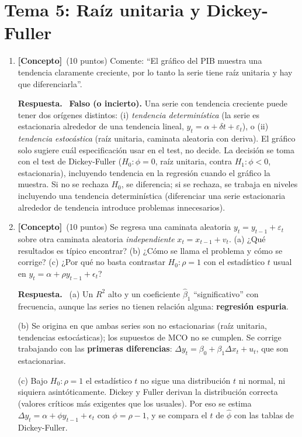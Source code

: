 \documentclass[12pt,letterpaper]{article}
\newenvironment{resp}{\begingroup\color{blue}\par\noindent\textbf{Respuesta.}\ }{\par\endgroup}
\newcommand{\tema}[1]{\section*{#1}}
\newcommand{\conc}{\textbf{[Concepto]}}
\begin{document}
\newpage
\tema{Tema 5: Raíz unitaria y Dickey-Fuller}

\begin{enumerate}[1.]

\item \conc\ (10 puntos) Comente: ``El gráfico del PIB muestra una tendencia claramente creciente, por lo tanto la serie tiene raíz unitaria y hay que diferenciarla''.

\begin{resp}
\textbf{Falso (o incierto).} Una serie con tendencia creciente puede tener dos orígenes distintos: (i) \emph{tendencia determinística} (la serie es estacionaria alrededor de una tendencia lineal, $y_t=\alpha+\delta t+\varepsilon_t$), o (ii) \emph{tendencia estocástica} (raíz unitaria, caminata aleatoria con deriva). El gráfico solo sugiere cuál especificación usar en el test, no decide. La decisión se toma con el test de Dickey-Fuller ($H_0:\phi=0$, raíz unitaria, contra $H_1:\phi<0$, estacionaria), incluyendo tendencia en la regresión cuando el gráfico la muestra. Si no se rechaza $H_0$, se diferencia; si se rechaza, se trabaja en niveles incluyendo una tendencia determinística (diferenciar una serie estacionaria alrededor de tendencia introduce problemas innecesarios).
\end{resp}

\item \conc\ (10 puntos) Se regresa una caminata aleatoria $y_t=y_{t-1}+\varepsilon_t$ sobre otra caminata aleatoria \emph{independiente} $x_t=x_{t-1}+v_t$. (a) ¿Qué resultados es típico encontrar? (b) ¿Cómo se llama el problema y cómo se corrige? (c) ¿Por qué no basta contrastar $H_0:\rho=1$ con el estadístico $t$ usual en $y_t=\alpha+\rho y_{t-1}+\epsilon_t$?

\begin{resp}
(a) Un $R^2$ alto y un coeficiente $\hat\beta_1$ ``significativo'' con frecuencia, aunque las series no tienen relación alguna: \textbf{regresión espuria}.

(b) Se origina en que ambas series son no estacionarias (raíz unitaria, tendencias estocásticas); los supuestos de MCO no se cumplen. Se corrige trabajando con las \textbf{primeras diferencias}: $\Delta y_t=\beta_0+\beta_1\Delta x_t+u_t$, que son estacionarias.

(c) Bajo $H_0:\rho=1$ el estadístico $t$ no sigue una distribución $t$ ni normal, ni siquiera asintóticamente. Dickey y Fuller derivan la distribución correcta (valores críticos más exigentes que los usuales). Por eso se estima $\Delta y_t=\alpha+\phi y_{t-1}+\epsilon_t$ con $\phi=\rho-1$, y se compara el $t$ de $\hat\phi$ con las tablas de Dickey-Fuller.
\end{resp}


\end{enumerate}
\end{document}
